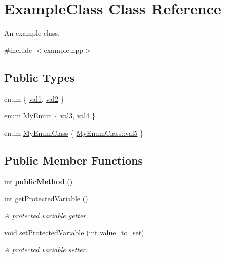 \hypertarget{class_example_class}{}\section{Example\+Class Class Reference}
\label{class_example_class}


An example class.  




{\ttfamily \#include $<$example.\+hpp$>$}

\subsection*{Public Types}
\begin{DoxyCompactItemize}
\item 
enum \{ \hyperlink{class_example_class_a03527d912021f436884478524799c002a888f6de05ec2f5eafad41e86294cd55c}{val1}, 
\hyperlink{class_example_class_a03527d912021f436884478524799c002a415eb1c082ecbf38b9f987e7555924e8}{val2}
 \}
\item 
enum \hyperlink{class_example_class_a18344ab645e45ff0a5367165c1de4e49}{My\+Enum} \{ \hyperlink{class_example_class_a18344ab645e45ff0a5367165c1de4e49a0beb644dc2dffe528a24f9e234b4dbbf}{val3}, 
\hyperlink{class_example_class_a18344ab645e45ff0a5367165c1de4e49a0b0bdd2addee78b5e0532708cc8869df}{val4}
 \}
\item 
enum \hyperlink{class_example_class_a859922aeb83d42f298a7ad3afde747fe}{My\+Enum\+Class} \{ \hyperlink{class_example_class_a859922aeb83d42f298a7ad3afde747fea294a6e0d759cdbcf55753c4a58161721}{My\+Enum\+Class\+::val5}
 \}
\end{DoxyCompactItemize}
\subsection*{Public Member Functions}
\begin{DoxyCompactItemize}
\item 
\hypertarget{class_example_class_a37681b1c9347de1ddde97c5c347c82c2}{}int {\bfseries public\+Method} ()\label{class_example_class_a37681b1c9347de1ddde97c5c347c82c2}

\item 
int \hyperlink{class_example_class_a016a82c2e3f6a7403c555a134a99d115}{get\+Protected\+Variable} ()
\begin{DoxyCompactList}\small\item\em A protected variable getter. \end{DoxyCompactList}\item 
void \hyperlink{class_example_class_ab8c1c5cf0ad8c4f7b8e13e7f1b1aa2cd}{set\+Protected\+Variable} (int value\+\_\+to\+\_\+set)
\begin{DoxyCompactList}\small\item\em A protected variable setter. \end{DoxyCompactList}\end{DoxyCompactItemize}
